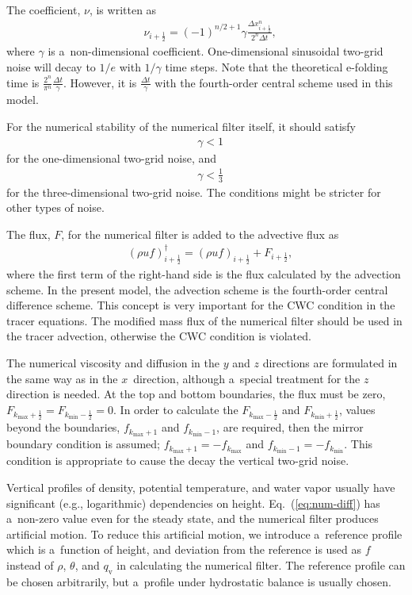 The coefficient, $\nu$, is written as
\begin{align}
&\nu_{i+\frac{1}{2}} = (-1)^{n/2+1} \gamma \frac{\Delta x_{i+\frac{1}{2}}^n}{2^n\Delta t},
\end{align}
where $\gamma$ is a~non-dimensional coefficient.
One-dimensional sinusoidal two-grid noise will decay to $1/e$ with $1/\gamma$ time steps.
Note that the theoretical e-folding time is $\frac{2^n}{\pi^n}\frac{\Delta t}{\gamma}$.
However, it is $\frac{\Delta t}{\gamma}$ with the fourth-order central scheme used in this model.


For the numerical stability of the numerical filter itself, it should satisfy
\begin{align}
&\gamma < 1
\end{align}
for the one-dimensional two-grid noise, and
\begin{align}
&\gamma < \frac{1}{3} \label{eq:condition-gamma}
\end{align}
for the three-dimensional two-grid noise.
The conditions might be stricter for other types of noise.

The flux, $F$, for the numerical filter is added to the advective flux as
\begin{align}
&(\rho u f)_{i+\frac{1}{2}}^{\dagger} = (\rho u f)_{i+\frac{1}{2}}+F_{i+\frac{1}{2}},
\end{align}
where the first term of the right-hand side is the flux calculated by the advection scheme.
In the present model, the advection scheme is the fourth-order central difference scheme.
This concept is very important for the CWC condition in the tracer equations.
The modified mass flux of the numerical filter should be used in the tracer advection, otherwise the CWC condition is violated.

The numerical viscosity and diffusion in the $y$ and $z$ directions are formulated in the same way as in the $x$~direction, although a~special treatment for the $z$ direction is needed.
At the top and bottom boundaries, the flux must be zero, $F_{k_{\max}+\frac{1}{2}} = F_{k_{\min}-\frac{1}{2}} = 0$.
In order to calculate the $F_{k_{\max}-\frac{1}{2}}$ and $F_{k_{\min}+\frac{1}{2}}$, values beyond the boundaries, $f_{k_{\max}+1}$ and $f_{k_{\min}-1}$, are required, then the mirror boundary condition is assumed; $f_{k_{\max}+1} = -f_{k_{\max}}$ and $f_{k_{\min}-1} = -f_{k_{\min}}$.
This condition is appropriate to cause the decay the vertical two-grid noise.


Vertical profiles of density, potential temperature, and water vapor usually have significant (e.g., logarithmic) dependencies on height.
Eq.~(\ref{eq:num-diff}) has a~non-zero value even for the steady state, and the numerical filter produces artificial motion.
To reduce this artificial motion, we introduce a~reference profile which is a~function of height, and deviation from the reference is used as $f$ instead of $\rho$, $\theta$, and $q_{\mathrm{v}}$ in calculating the numerical filter.
The reference profile can be chosen arbitrarily, but a~profile under hydrostatic balance is usually chosen.





